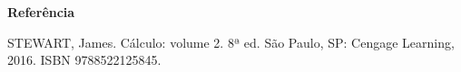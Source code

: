 \textbf{Referência}	
	
\begin{footnotesize}
	STEWART, James. Cálculo: volume 2. 8ª ed. São Paulo, SP: Cengage Learning, 2016. ISBN 9788522125845.
\end{footnotesize}
